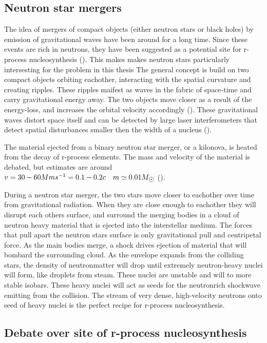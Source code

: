 \subsection{Neutron star mergers}
The idea of mergers of compact objects (either neutron stars or black holes) by emission of gravitational waves have been around for a long time. Since these events are rich in neutrons, they have been suggested as a potential site for r-process nucleosynthesis
().
This makes makes neutron stars particularly intersesting for the problem in this thesis 
The general concept is build on two compact objects orbiting eachother, interacting with the spatial curvature and creating ripples.
These ripples maifest as waves in the fabric of space-time and carry gravitational energy away.
The two objects move closer as a result of the energy-loss, and increases the orbital velocity accordingly ().
These gravitational waves distort space itself and can be detected by large laser interferometers that detect spatial disturbances smaller then the width of a nucleus ().

The material ejected from a binary neutron star merger, or a kilonova, is heated from the decay of r-process elements.
The mass and velocity of the material is debated,
but estimates are around $v=30-60 Mms^{-1} = 0.1-0.2c \quad m \simeq 0.01 \msol$ ().

During a neutron star merger, the two stars move closer to eachother over time from gravitational radiation. When they are close enough to eachother they will disrupt each others surface, and surround the merging bodies in a cloud of neutron heavy material that is ejected into the interstellar medium.
The forces that pull apart the neutron stars surface is only gravitational pull and centripetal force.
As the main bodies merge, a shock drives ejection of material that will bombard the surrounding cloud.
As the envelope expands from the colliding stars, the density of neutronmatter will drop until extremely neutron-heavy nuclei will form, like droplets from steam.
These nuclei are unstable and will \betadecay to more stable isobars.
These heavy nuclei will act as seeds for the neutronrich shockwave emitting from the collision.
The stream of very dense, high-velocity neutrons onto seed of heavy nuclei is the perfect recipe for r-process nucleosynthesis.

\subsection{Debate over site of r-process nucleosynthesis}

